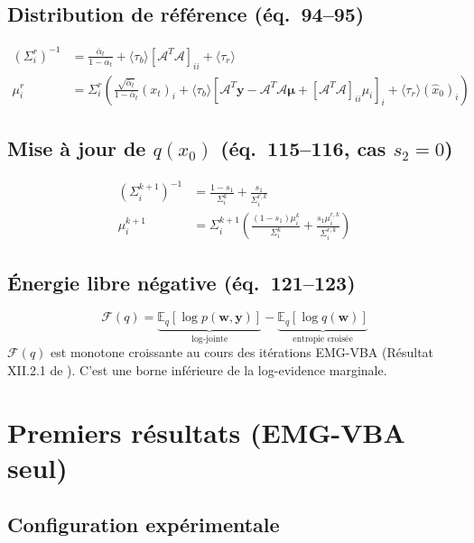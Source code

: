 \documentclass[12pt]{article}
\newcommand{\w}{\boldsymbol{w}}
\newcommand{\y}{\boldsymbol{y}}
\newcommand{\alt}{\bar\alpha_t}
\newcommand{\op}{\mathcal{A}}
\begin{document}
\subsection{Distribution de référence (éq.~94--95)}
\begin{align}
    (\Sigma_i^{r})^{-1} &= \frac{\alt}{1-\alt} + \langle\tau_b\rangle [\op^T\op]_{ii} + \langle\tau_r\rangle \\
    \mu_i^r &= \Sigma_i^r \left(\frac{\sqrt{\alt}}{1-\alt} (x_t)_i + \langle\tau_b\rangle [\op^T\y - \op^T\op\boldsymbol{\mu} + [\op^T\op]_{ii}\mu_i]_i + \langle\tau_r\rangle (\hat{x}_0)_i\right)
\end{align}

\subsection{Mise à jour de $q(x_0)$ (éq.~115--116, cas $s_2 = 0$)}
\begin{align}
    (\Sigma_i^{k+1})^{-1} &= \frac{1 - s_1}{\Sigma_i^k} + \frac{s_1}{\Sigma_i^{r,k}} \\
    \mu_i^{k+1} &= \Sigma_i^{k+1} \left(\frac{(1-s_1)\mu_i^k}{\Sigma_i^k} + \frac{s_1 \mu_i^{r,k}}{\Sigma_i^{r,k}}\right)
\end{align}

\subsection{Énergie libre négative (éq.~121--123)}
\begin{equation}
    \mathcal{F}(q) = \underbrace{\mathbb{E}_q[\log p(\w, \y)]}_{\text{log-jointe}} - \underbrace{\mathbb{E}_q[\log q(\w)]}_{\text{entropie croisée}}
\end{equation}
$\mathcal{F}(q)$ est monotone croissante au cours des itérations EMG-VBA (Résultat XII.2.1 de \cite{rapport_theorique}). C'est une borne inférieure de la log-evidence marginale.

\section{Premiers résultats (EMG-VBA seul)}

\subsection{Configuration expérimentale}
\end{document}
